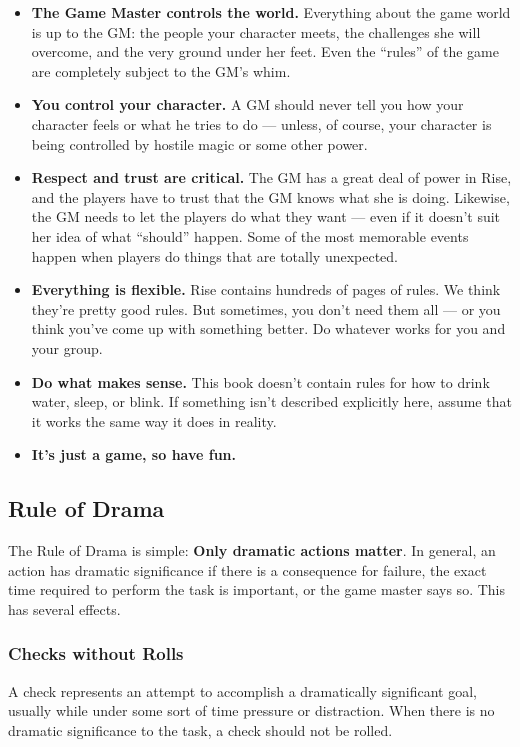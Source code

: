    \begin{itemize}
        \item \textbf{The Game Master controls the world.} Everything about the game world is up to the GM\@: the people your character meets, the challenges she will overcome, and the very ground under her feet.
            Even the ``rules'' of the game are completely subject to the GM's whim.
        \item \textbf{You control your character.} A GM should never tell you how your character feels or what he tries to do --- unless, of course, your character is being controlled by hostile magic or some other power.
        \item \textbf{Respect and trust are critical.} The GM has a great deal of power in Rise, and the players have to trust that the GM knows what she is doing.
            Likewise, the GM needs to let the players do what they want --- even if it doesn't suit her idea of what ``should'' happen.
            Some of the most memorable events happen when players do things that are totally unexpected.
        \item \textbf{Everything is flexible.} Rise contains hundreds of pages of rules.
            We think they're pretty good rules.
            But sometimes, you don't need them all --- or you think you've come up with something better.
            Do whatever works for you and your group.
        \item \textbf{Do what makes sense.} This book doesn't contain rules for how to drink water, sleep, or blink.
            If something isn't described explicitly here, assume that it works the same way it does in reality.
        \item \textbf{It's just a game, so have fun.}
    \end{itemize}

    \subsection{Rule of Drama}

        The Rule of Drama is simple: \textbf{Only dramatic actions matter}.
        In general, an action has dramatic significance if there is a consequence for failure, the exact time required to perform the task is important, or the game master says so.
        This has several effects.

        \subsubsection{Checks without Rolls}
            A check represents an attempt to accomplish a dramatically significant goal, usually while under some sort of time pressure or distraction.
            When there is no dramatic significance to the task, a check should not be rolled.

